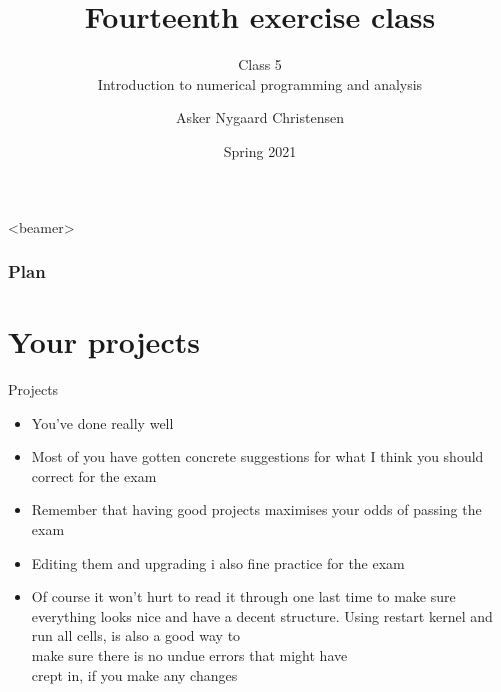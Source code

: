 \documentclass[10pt,danish,t,10pt]{beamer}
\title{Fourteenth exercise class \vspace{-2mm}}
\subtitle{Class 5 \\Introduction to numerical programming and analysis \vspace{-4mm} }
\author{Asker Nygaard Christensen}
\date{Spring 2021}
\makeatletter
\let\origtableofcontents=\tableofcontents
\def\tableofcontents{\@ifnextchar[{\origtableofcontents}{\gobbletableofcontents}}
\def\gobbletableofcontents#1{\origtableofcontents}
\makeatother
\begin{document}
{
\begin{frame}

\maketitle


\end{frame}
}

\addtocounter{framenumber}{-1}

\begin{frame}<beamer>
\frametitle{Plan}

\tableofcontents[]
\end{frame}


\section{Your projects}
\begin{frame}{Projects}
\begin{itemize}
    \item You've done really well
    \item Most of you have gotten concrete suggestions for what I think you should correct for the exam
    \item Remember that having good projects maximises your odds of passing the exam
    \item Editing them and upgrading i also fine practice for the exam
    \item Of course it won't hurt to read it through one last time to make sure everything looks nice and have a decent structure. Using restart kernel and run all cells, is also a good way to \\
    make sure there is no undue errors that might have \\
    crept in, if you make any changes
\end{itemize}

\end{frame}
\end{document}
